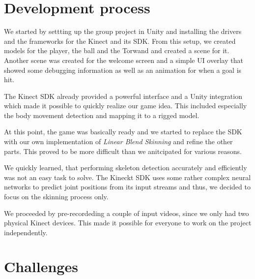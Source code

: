 \documentclass[a4paper,pagesize 10pt]{scrartcl}
\def\linearBlendSkinning{\textit{\linearBlendSkinningn}}
\def\linearBlendSkinningn{Linear Blend Skinning}
\begin{document}

\section{Development process}
We started by settting up the group project in Unity and installing the drivers and the frameworks for the Kinect and its SDK.
From this setup, we created models for the player, the ball and the Torwand and created a scene for it.
Another scene was created for the welcome screen and a simple UI overlay that showed some debugging information as well as an animation for when a goal is hit.

The Kinect SDK already provided a powerful interface and a Unity integration which made it possible to quickly realize our game idea.
This included especially the body movement detection and mapping it to a rigged model. 

At this point, the game was basically ready and we started to replace the SDK with our own implementation of \linearBlendSkinning{} and refine the other parts.
This proved to be more difficult than we anitcipated for various reasons. 

We quickly learned, that performing skeleton detection accurately and efficiently was not an easy task to solve.
The Kineckt SDK uses some rather complex neural networks to predict joint positions from its input streams and thus, we decided to focus on the skinning process only.

We proceeded by pre-recordeding a couple of input videos, since we only had two physical Kinect devices.
This made it possible for everyone to work on the project independently.

\section{Challenges}
\end{document}
